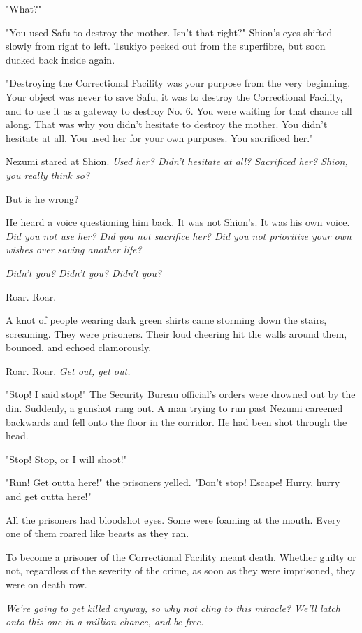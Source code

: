 "What?"

"You used Safu to destroy the mother. Isn't that right?" Shion's eyes
shifted slowly from right to left. Tsukiyo peeked out from the
superfibre, but soon ducked back inside again.

"Destroying the Correctional Facility was your purpose from the very
beginning. Your object was never to save Safu, it was to destroy the
Correctional Facility, and to use it as a gateway to destroy No. 6. You
were waiting for that chance all along. That was why you didn't hesitate
to destroy the mother. You didn't hesitate at all. You used her for your
own purposes. You sacrificed her."

Nezumi stared at Shion. \emph{Used her? Didn't hesitate at all? Sacrificed
	her? Shion, you really think so?}

But is he wrong?

He heard a voice questioning him back. It was not Shion's. It was his
own voice. \emph{Did you not use her? Did you not sacrifice her? Did you not
	prioritize your own wishes over saving another life?}

\emph{Didn't you? Didn't you? Didn't you?}

Roar. Roar.

A knot of people wearing dark green shirts came storming down the
stairs, screaming. They were prisoners. Their loud cheering hit the
walls around them, bounced, and echoed clamorously.

Roar. Roar. \emph{Get out, get out.}

"Stop! I said stop!" The Security Bureau official's orders were drowned
out by the din. Suddenly, a gunshot rang out. A man trying to run past
Nezumi careened backwards and fell onto the floor in the corridor. He
had been shot through the head.

"Stop! Stop, or I will shoot!"

"Run! Get outta here!" the prisoners yelled. "Don't stop! Escape! Hurry,
hurry and get outta here!"

All the prisoners had bloodshot eyes. Some were foaming at the mouth.
Every one of them roared like beasts as they ran.

To become a prisoner of the Correctional Facility meant death. Whether
guilty or not, regardless of the severity of the crime, as soon as they
were imprisoned, they were on death row.

\emph{We're going to get killed anyway, so why not cling to this miracle?
	We'll latch onto this one-in-a-million chance, and be free.}


